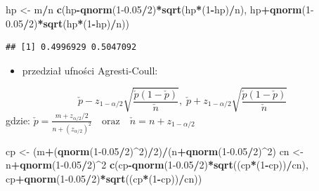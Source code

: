 \documentclass[polish,]{book}
\newenvironment{Shaded}{\begin{snugshade}}{\end{snugshade}}
\newcommand{\DecValTok}[1]{\textcolor[rgb]{0.00,0.00,0.81}{#1}}
\newcommand{\FloatTok}[1]{\textcolor[rgb]{0.00,0.00,0.81}{#1}}
\newcommand{\KeywordTok}[1]{\textcolor[rgb]{0.13,0.29,0.53}{\textbf{#1}}}
\newcommand{\NormalTok}[1]{#1}
\newcommand{\OperatorTok}[1]{\textcolor[rgb]{0.81,0.36,0.00}{\textbf{#1}}}
\newcommand{\StringTok}[1]{\textcolor[rgb]{0.31,0.60,0.02}{#1}}
\providecommand{\tightlist}{%
  \setlength{\itemsep}{0pt}\setlength{\parskip}{0pt}}
\begin{document}
\begin{Shaded}
\begin{Highlighting}[]
\NormalTok{hp <-}\StringTok{ }\NormalTok{m}\OperatorTok{/}\NormalTok{n}
\KeywordTok{c}\NormalTok{(hp}\OperatorTok{-}\KeywordTok{qnorm}\NormalTok{(}\DecValTok{1}\FloatTok{-0.05}\OperatorTok{/}\DecValTok{2}\NormalTok{)}\OperatorTok{*}\KeywordTok{sqrt}\NormalTok{(hp}\OperatorTok{*}\NormalTok{(}\DecValTok{1}\OperatorTok{-}\NormalTok{hp)}\OperatorTok{/}\NormalTok{n),}
\NormalTok{  hp}\OperatorTok{+}\KeywordTok{qnorm}\NormalTok{(}\DecValTok{1}\FloatTok{-0.05}\OperatorTok{/}\DecValTok{2}\NormalTok{)}\OperatorTok{*}\KeywordTok{sqrt}\NormalTok{(hp}\OperatorTok{*}\NormalTok{(}\DecValTok{1}\OperatorTok{-}\NormalTok{hp)}\OperatorTok{/}\NormalTok{n))}
\end{Highlighting}
\end{Shaded}

\begin{verbatim}
## [1] 0.4996929 0.5047092
\end{verbatim}

\begin{itemize}
\tightlist
\item
  przedział ufności Agresti-Coull:
\end{itemize}

\begin{equation}
\check{p}-z_{1-\alpha/2}\sqrt{\frac{\check{p}(1-\check{p})}{\check{n}}},\;
\check{p}+z_{1-\alpha/2}\sqrt{\frac{\check{p}(1-\check{p})}{\check{n}}}
\label{eq:wz1161}
\end{equation}
gdzie: \(\check{p}=\frac{m+z_{\alpha/2}/2}{n+(z_{\alpha/2})^2}\quad\mbox{oraz}\quad \check{n}=n+z_{1-\alpha/2}\)

\begin{Shaded}
\begin{Highlighting}[]
\NormalTok{cp <-}\StringTok{ }\NormalTok{(m}\OperatorTok{+}\NormalTok{(}\KeywordTok{qnorm}\NormalTok{(}\DecValTok{1}\FloatTok{-0.05}\OperatorTok{/}\DecValTok{2}\NormalTok{)}\OperatorTok{^}\DecValTok{2}\NormalTok{)}\OperatorTok{/}\DecValTok{2}\NormalTok{)}\OperatorTok{/}\NormalTok{(n}\OperatorTok{+}\KeywordTok{qnorm}\NormalTok{(}\DecValTok{1}\FloatTok{-0.05}\OperatorTok{/}\DecValTok{2}\NormalTok{)}\OperatorTok{^}\DecValTok{2}\NormalTok{)}
\NormalTok{cn <-}\StringTok{ }\NormalTok{n}\OperatorTok{+}\KeywordTok{qnorm}\NormalTok{(}\DecValTok{1}\FloatTok{-0.05}\OperatorTok{/}\DecValTok{2}\NormalTok{)}\OperatorTok{^}\DecValTok{2}
\KeywordTok{c}\NormalTok{(cp}\OperatorTok{-}\KeywordTok{qnorm}\NormalTok{(}\DecValTok{1}\FloatTok{-0.05}\OperatorTok{/}\DecValTok{2}\NormalTok{)}\OperatorTok{*}\KeywordTok{sqrt}\NormalTok{((cp}\OperatorTok{*}\NormalTok{(}\DecValTok{1}\OperatorTok{-}\NormalTok{cp))}\OperatorTok{/}\NormalTok{cn),}
\NormalTok{  cp}\OperatorTok{+}\KeywordTok{qnorm}\NormalTok{(}\DecValTok{1}\FloatTok{-0.05}\OperatorTok{/}\DecValTok{2}\NormalTok{)}\OperatorTok{*}\KeywordTok{sqrt}\NormalTok{((cp}\OperatorTok{*}\NormalTok{(}\DecValTok{1}\OperatorTok{-}\NormalTok{cp))}\OperatorTok{/}\NormalTok{cn))}
\end{Highlighting}
\end{Shaded}
\end{document}
